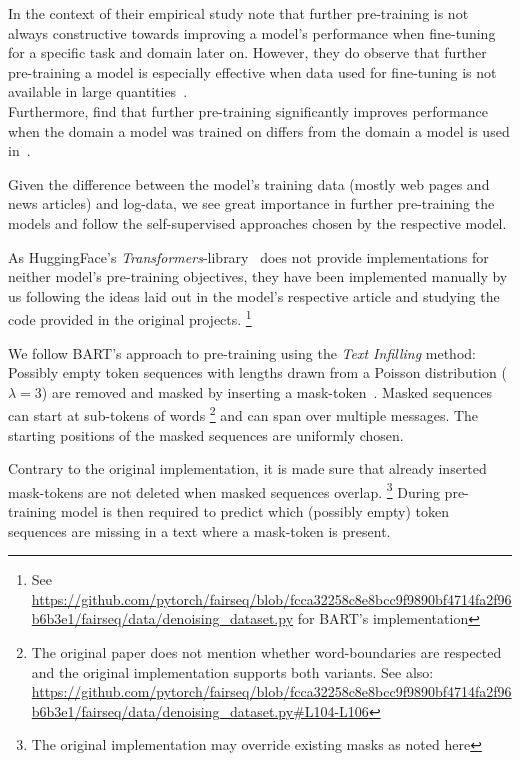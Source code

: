 In the context of their empirical study \citeauthor*{pretraining_study} note that further pre-training is not always
constructive towards improving a model's performance when fine-tuning for a specific task and domain later on.
However, they do observe that further pre-training a model is especially effective
when data used for fine-tuning is not available in large quantities~\parencite[56-57]{pretraining_study}.\\
Furthermore, \citeauthor*{dont_stop_pretraining} find that further pre-training significantly improves performance
when the domain a model was trained on differs from the domain a model is used in~\parencite[8345]{dont_stop_pretraining}.

Given the difference between the model's training data (mostly web pages and news articles) and log-data,
we see great importance in further pre-training the models and follow the self-supervised approaches
chosen by the respective model.

As HuggingFace's \emph{Transformers}-library~\parencite{huggingface_transformers}
does not provide implementations for neither model's pre-training objectives,
they have been implemented manually by us following the ideas laid out in the model's respective article
and studying the code provided in the original projects.%
\footnote{See
\url{https://github.com/pytorch/fairseq/blob/fcca32258c8e8bcc9f9890bf4714fa2f96b6b3e1/fairseq/data/denoising_dataset.py}
for BART's implementation}%

We follow BART's approach to pre-training using the \emph{Text Infilling} method:
Possibly empty token sequences with lengths drawn from a
Poisson distribution (\(\lambda = 3\)) are removed and
masked by inserting a mask-token~\parencite[7873]{bart}.
Masked sequences can start at sub-tokens of words%
\footnote{The original paper does not mention whether word-boundaries are respected and the original implementation supports both variants.
See also: \url{https://github.com/pytorch/fairseq/blob/fcca32258c8e8bcc9f9890bf4714fa2f96b6b3e1/fairseq/data/denoising_dataset.py\#L104-L106}}
and can span over multiple messages.
The starting positions of the masked sequences are uniformly chosen.

Contrary to the original implementation,
it is made sure that already inserted mask-tokens are not deleted when masked sequences overlap.%
\footnote{The original implementation may override existing masks as noted here }
During pre-training model is then required to predict which (possibly empty)
token sequences are missing in a text where a mask-token is present.

